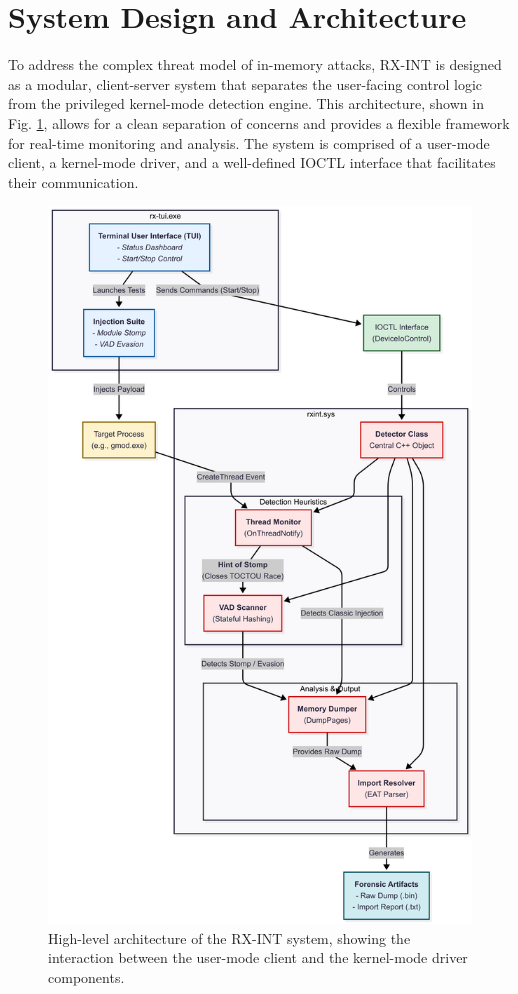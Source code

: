\documentclass[journal]{IEEEtran}
\begin{document}
\section{System Design and Architecture}
\label{sec:design}
To address the complex threat model of in-memory attacks, RX-INT is designed as a modular, client-server system that separates the user-facing control logic from the privileged kernel-mode detection engine. This architecture, shown in Fig. \ref{fig_architecture}, allows for a clean separation of concerns and provides a flexible framework for real-time monitoring and analysis. The system is comprised of a user-mode client, a kernel-mode driver, and a well-defined IOCTL interface that facilitates their communication.
\begin{figure}[!t]
\centering
\includegraphics[width=0.9\columnwidth]{figures/architecture.png}
\caption{High-level architecture of the RX-INT system, showing the interaction between the user-mode client and the kernel-mode driver components.}
\label{fig_architecture}
\end{figure}
\end{document}
